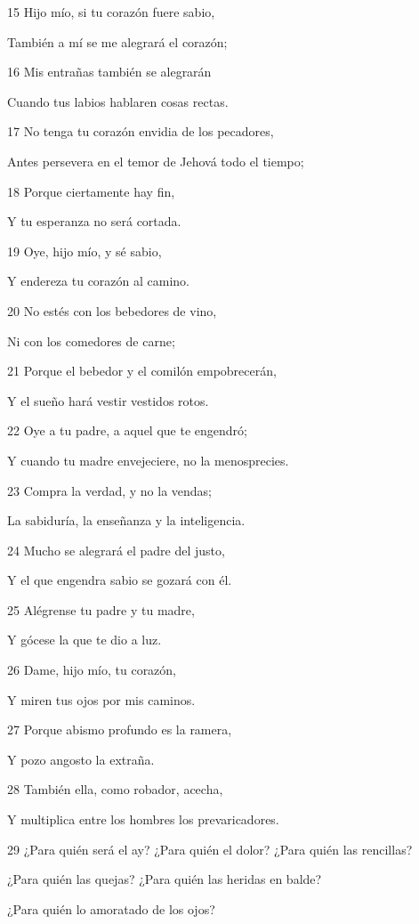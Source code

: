 \par 15 Hijo mío, si tu corazón fuere sabio,
\par También a mí se me alegrará el corazón;
\par 16 Mis entrañas también se alegrarán 
\par Cuando tus labios hablaren cosas rectas.
\par 17 No tenga tu corazón envidia de los pecadores,
\par Antes persevera en el temor de Jehová todo el tiempo;
\par 18 Porque ciertamente hay fin,
\par Y tu esperanza no será cortada.
\par 19 Oye, hijo mío, y sé sabio,
\par Y endereza tu corazón al camino.
\par 20 No estés con los bebedores de vino,
\par Ni con los comedores de carne;
\par 21 Porque el bebedor y el comilón empobrecerán,
\par Y el sueño hará vestir vestidos rotos.
\par 22 Oye a tu padre, a aquel que te engendró;
\par Y cuando tu madre envejeciere, no la menosprecies.
\par 23 Compra la verdad, y no la vendas;
\par La sabiduría, la enseñanza y la inteligencia.
\par 24 Mucho se alegrará el padre del justo,
\par Y el que engendra sabio se gozará con él.
\par 25 Alégrense tu padre y tu madre,
\par Y gócese la que te dio a luz.
\par 26 Dame, hijo mío, tu corazón,
\par Y miren tus ojos por mis caminos.
\par 27 Porque abismo profundo es la ramera,
\par Y pozo angosto la extraña.
\par 28 También ella, como robador, acecha,
\par Y multiplica entre los hombres los prevaricadores.
\par 29 ¿Para quién será el ay? ¿Para quién el dolor? ¿Para quién las rencillas?
\par ¿Para quién las quejas? ¿Para quién las heridas en balde?
\par ¿Para quién lo amoratado de los ojos?
